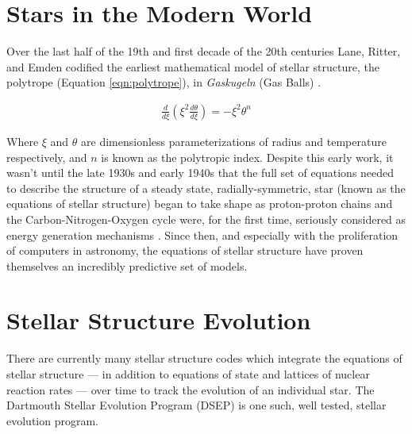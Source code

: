 \chapter{Stars in the Modern World}
Over the last half of the 19th and first decade of the 20th centuries Lane,
Ritter, and Emden codified the earliest mathematical model of stellar
structure, the polytrope (Equation \ref{eqn:polytrope}), in \textit{Gaskugeln}
(Gas Balls) \citep{Emden1907}.

\begin{align}\label{eqn:polytrope}
	\frac{d}{d\xi}\left(\xi^{2}\frac{d\theta}{d\xi}\right) = -\xi^{2}\theta^{n}
\end{align}

Where $\xi$ and $\theta$ are dimensionless parameterizations of radius and
temperature respectively, and $n$ is known as the polytropic index. Despite this
early work, it wasn't until the late 1930s and early 1940s that the full set of
equations needed to describe the structure of a steady state,
radially-symmetric, star (known as the equations of stellar structure) began to
take shape as proton-proton chains and the Carbon-Nitrogen-Oxygen cycle were,
for the first time, seriously considered as energy generation mechanisms
\citep{Cowling1966}. Since then, and especially with the proliferation of
computers in astronomy, the equations of stellar structure have proven
themselves an incredibly predictive set of models.  

\chapter{Stellar Structure Evolution}
There are currently many stellar structure codes \citep[e.g.][]{Dotter2008,
Kovetz2009, Paxton2011} which integrate the equations of stellar structure ---
in addition to equations of state and lattices of nuclear reaction rates ---
over time to track the evolution of an individual star. The Dartmouth Stellar
Evolution Program (DSEP) \citep{Chaboyer2001, Bjork2006, Dotter2008} is one
such, well tested, stellar evolution program.

